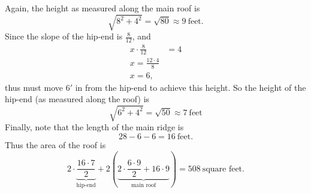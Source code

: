 \documentclass[hints,nooutcomes,noauthor,handout]{ximera}
\begin{document}
\begin{question}
\begin{freeResponse}
\begin{enumerate}
\[      \]
      Again, the height as measured along the main roof is
      \[
      \sqrt{8^2+4^2} = \sqrt{80}\approx 9~\text{feet}.
      \]
      Since the slope of the hip-end is $\frac{8}{12}$, and
      \begin{align*}
        x\cdot \frac{8}{12} &= 4\\
        x = \frac{12\cdot 4}{8}\\
        x = 6,
      \end{align*}
      thus must move $6'$ in from the hip-end to achieve this height.
      So the height of the hip-end (as measured along the roof) is
      \[
      \sqrt{6^2+4^2} = \sqrt{50} \approx 7~\text{feet}
      \]
      Finally, note that the length of the main ridge is
      \[
      28-6-6 = 16~\text{feet}.
      \]
      Thus the area of the roof is
      \[
      2\cdot \underbrace{\frac{16\cdot 7}{2}}_{\text{hip-end}} +
      2\left(\underbrace{2\cdot \frac{6\cdot 9}{2} + 16\cdot
        9}_{\text{main roof}}\right) = 508~\text{square feet}.
      \]
  \end{enumerate}
\end{freeResponse}


\end{question}
\mynewpage
\end{document}
